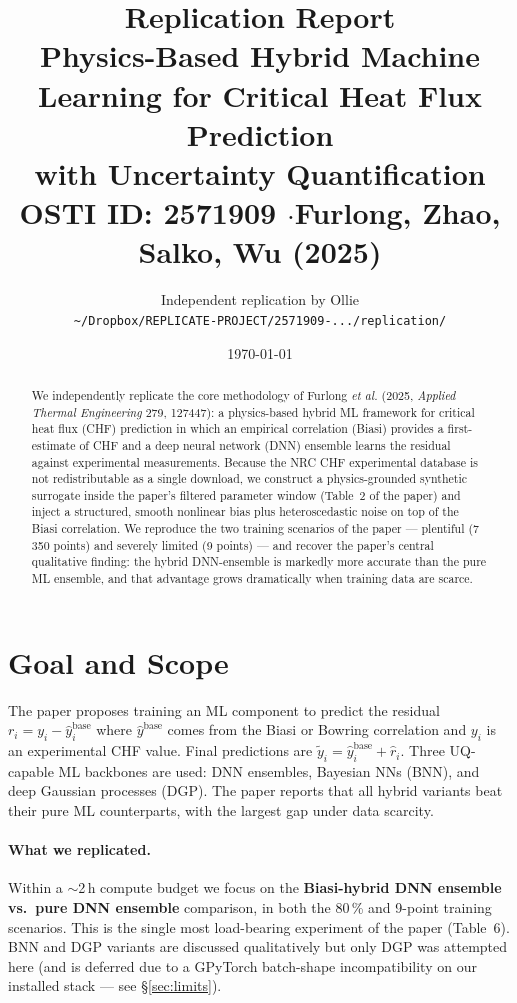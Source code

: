 \documentclass[11pt,a4paper]{article}
\title{\textbf{Replication Report}\\[0.4em]
\large Physics-Based Hybrid Machine Learning for Critical Heat Flux Prediction\\
with Uncertainty Quantification\\[0.3em]
\normalsize OSTI ID: 2571909 \quad $\cdot$\quad Furlong, Zhao, Salko, Wu (2025)}
\author{Independent replication by Ollie\\
\small \texttt{\~{}/Dropbox/REPLICATE-PROJECT/2571909-...\slash replication/}}
\date{\today}
\begin{document}
\maketitle

\begin{abstract}
We independently replicate the core methodology of Furlong \emph{et al.}
(2025, \emph{Applied Thermal Engineering} 279, 127447): a
physics-based hybrid ML framework for critical heat flux (CHF)
prediction in which an empirical correlation (Biasi) provides a
first-estimate of CHF and a deep neural network (DNN) ensemble learns
the residual against experimental measurements.  Because the NRC CHF
experimental database is not redistributable as a single download, we
construct a physics-grounded synthetic surrogate inside the paper's
filtered parameter window (Table~2 of the paper) and inject a
structured, smooth nonlinear bias plus heteroscedastic noise on top of
the Biasi correlation.  We reproduce the two training scenarios of the
paper --- plentiful (7\,350 points) and severely limited (9 points) ---
and recover the paper's central qualitative finding: the hybrid
DNN-ensemble is markedly more accurate than the pure ML ensemble, and
that advantage grows dramatically when training data are scarce.
\end{abstract}

\tableofcontents

\section{Goal and Scope}
The paper proposes training an ML component to predict the residual
$r_i = y_i - \hat y_i^{\text{base}}$ where $\hat y^{\text{base}}$ comes
from the Biasi or Bowring correlation and $y_i$ is an experimental CHF
value.  Final predictions are $\tilde y_i = \hat y_i^{\text{base}} +
\hat r_i$.  Three UQ-capable ML backbones are used: DNN ensembles,
Bayesian NNs (BNN), and deep Gaussian processes (DGP).  The paper
reports that all hybrid variants beat their pure ML counterparts, with
the largest gap under data scarcity.

\paragraph{What we replicated.}  Within a $\sim$2\,h compute budget we
focus on the \textbf{Biasi-hybrid DNN ensemble vs.\ pure DNN ensemble}
comparison, in both the 80\,\% and 9-point training scenarios.  This is
the single most load-bearing experiment of the paper (Table~6).  BNN
and DGP variants are discussed qualitatively but only DGP was attempted
here (and is deferred due to a GPyTorch batch-shape incompatibility on
our installed stack --- see \S\ref{sec:limits}).
\end{document}
